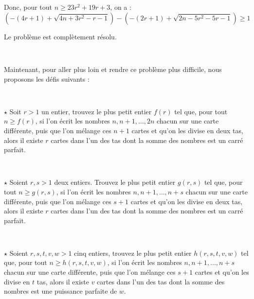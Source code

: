 \

\

Donc, pour tout $n \geqslant 23 r^2 + 19 r + 3$, on a :
\[
\left( - (4r + 1) + \sqrt{4n + 3r^2 - r - 1} \right) - 
\left( - (2r + 1) + \sqrt{2n - 5r^2 - 5r - 1} \right) \geq 1
\]



Le probl{\`e}me est compl{\`e}tement r{\'e}solu.

\

Maintenant, pour aller plus loin et rendre ce probl{\`e}me plus difficile,
nous proposons les d{\'e}fis suivants :

\



$\star$ Soit $r > 1$ un entier, trouvez le plus petit entier $f (r)$ tel que,
pour tout $n \geqslant f (r)$, si l'on {\'e}crit les nombres $n, n + 1,
\ldots, 2 n$ chacun sur une carte diff{\'e}rente, puis que l'on m{\'e}lange
ces $n + 1$ cartes et qu'on les divise en deux tas, alors il existe $r$ cartes
dans l'un des tas dont la somme des nombres est un carr{\'e} parfait.

\


$\star$ Soient $r, s > 1$ deux entiers. Trouvez le plus petit entier $g(r, s)$ tel que, pour tout $n \geqslant g(r, s)$, si l'on écrit les nombres $n, n + 1, \ldots, n + s$ chacun sur une carte diff{\'e}rente, puis que l'on
m{\'e}lange ces $s + 1$ cartes et qu'on les divise en deux tas, alors il
existe $r$ cartes dans l'un des tas dont la somme des nombres est un carr{\'e}
parfait.

\


$\star$ Soient $r, s, t, v, w > 1$ cinq entiers, trouvez le plus petit entier
$h (r, s, t, v, w)$ tel que, pour tout $n \geqslant h (r, s, t, v, w)$, si
l'on {\'e}crit les nombres $n, n + 1, \ldots, n + s$ chacun sur une carte
diff{\'e}rente, puis que l'on m{\'e}lange ces $s + 1$ cartes et qu'on les
divise en $t$ tas, alors il existe $v$ cartes dans l'un des tas dont la somme
des nombres est une puissance parfaite de $w$.